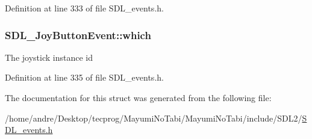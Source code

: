 Definition at line 333 of file S\-D\-L\-\_\-events.\-h.

\hypertarget{struct_s_d_l___joy_button_event_a1679049adad7242b28420948fdc79044}{
\subsubsection[{which}]{ S\-D\-L\-\_\-\-Joy\-Button\-Event\-::which}}\label{struct_s_d_l___joy_button_event_a1679049adad7242b28420948fdc79044}
The joystick instance id 

Definition at line 335 of file S\-D\-L\-\_\-events.\-h.



The documentation for this struct was generated from the following file\-:\begin{DoxyCompactItemize}
\item 
/home/andre/\-Desktop/tecprog/\-Mayumi\-No\-Tabi/\-Mayumi\-No\-Tabi/include/\-S\-D\-L2/\hyperlink{_s_d_l__events_8h}{S\-D\-L\-\_\-events.\-h}\end{DoxyCompactItemize}
